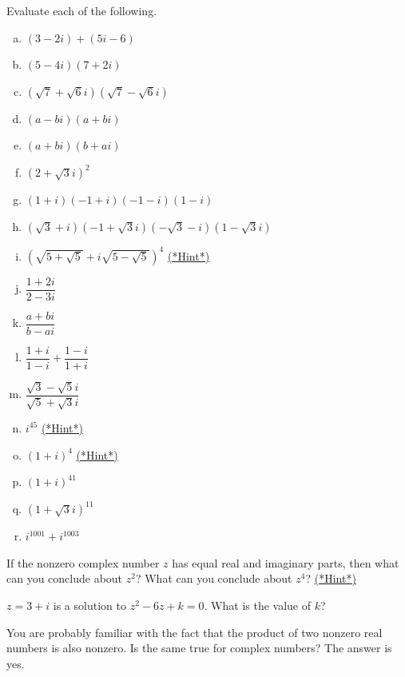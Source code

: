 \begin{exercise}\label{exercise:complex:9}
Evaluate each of the following.
\begin{multicols}{2}
\begin{enumerate}[(a)]
\item
$(3-2i)+ (5i-6)$
\item
$(5-4i)(7+2i)$
\item
$(\sqrt{7} + \sqrt{6}i)(\sqrt{7} - \sqrt{6}i)$
\item
$(a - bi)(a + bi)$
\item
$(a + bi)(b + ai)$
\item
$(2 + \sqrt{3}i)^2$
\item
$(1+i)(-1+i)(-1-i)(1-i)$
\item
$(\sqrt{3}+i)(-1+ \sqrt{3}i)(-\sqrt{3}-i)(1 -\sqrt{3}i)$
\item
$\left(\sqrt{5 + \sqrt{5}} + i\sqrt{5 - \sqrt{5}}\right)^4$
\hyperref[sec:complex:hints]{(*Hint*)}
\item
$\dfrac{1+2i}{2-3i}$
\item
$\dfrac{a+bi}{b-ai}$
\item
$\dfrac{1+i}{1-i} + \dfrac{1-i}{1+i}$
\item
$\dfrac{\sqrt{3} - \sqrt{5}i}{\sqrt{5} + \sqrt{3}i}$
 \item
$i^{45}$
\hyperref[sec:complex:hints]{(*Hint*)}
\item
$(1 + i)^4$  
\hyperref[sec:complex:hints]{(*Hint*)}
\item
$(1 + i)^{41}$
\item
$(1 + \sqrt{3}i)^{11}$
\item
$i^{1001} + i^{1003}$
\end{enumerate}
\end{multicols}
\end{exercise}

\begin{exercise}\label{exercise:complex:10}
If the nonzero complex number $z$ has equal real and imaginary parts, then what can you conclude about $z^2$?   What can you conclude about $z^4$? 
\hyperref[sec:complex:hints]{(*Hint*)}
\end{exercise}

\begin{exercise}\label{exercise:complex:findk}
$z = 3+i$ is a solution to $z^2 - 6z + k = 0$.  What is the value of $k$?
\end{exercise}


You are probably familiar with the fact that the product of two nonzero real numbers is also nonzero. Is the same true for complex numbers? The answer is yes.

